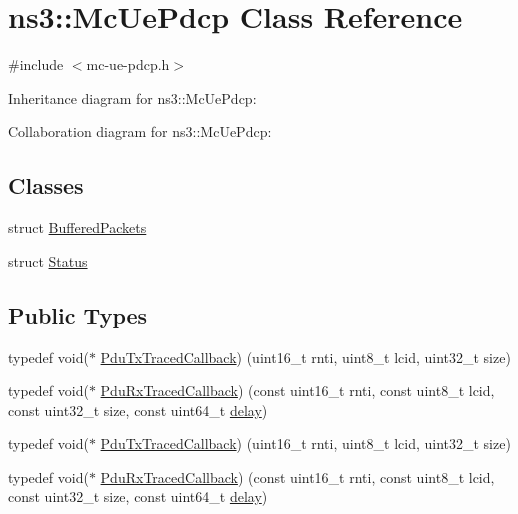 \hypertarget{classns3_1_1McUePdcp}{}\section{ns3\+:\+:Mc\+Ue\+Pdcp Class Reference}
\label{classns3_1_1McUePdcp}


{\ttfamily \#include $<$mc-\/ue-\/pdcp.\+h$>$}



Inheritance diagram for ns3\+:\+:Mc\+Ue\+Pdcp\+:


Collaboration diagram for ns3\+:\+:Mc\+Ue\+Pdcp\+:
\subsection*{Classes}
\begin{DoxyCompactItemize}
\item 
struct \hyperlink{structns3_1_1McUePdcp_1_1BufferedPackets}{Buffered\+Packets}
\item 
struct \hyperlink{structns3_1_1McUePdcp_1_1Status}{Status}
\end{DoxyCompactItemize}
\subsection*{Public Types}
\begin{DoxyCompactItemize}
\item 
typedef void($\ast$ \hyperlink{classns3_1_1McUePdcp_af312eee3e1ec8a049a82210699f47289}{Pdu\+Tx\+Traced\+Callback}) (uint16\+\_\+t rnti, uint8\+\_\+t lcid, uint32\+\_\+t size)
\item 
typedef void($\ast$ \hyperlink{classns3_1_1McUePdcp_af8bd88140b3e71f03ae54e4381183794}{Pdu\+Rx\+Traced\+Callback}) (const uint16\+\_\+t rnti, const uint8\+\_\+t lcid, const uint32\+\_\+t size, const uint64\+\_\+t \hyperlink{mmwave_2model_2fading-traces_2fading__trace__generator_8m_a7964e6aa8f61a9d28973c8267a606ad8}{delay})
\item 
typedef void($\ast$ \hyperlink{classns3_1_1McUePdcp_af312eee3e1ec8a049a82210699f47289}{Pdu\+Tx\+Traced\+Callback}) (uint16\+\_\+t rnti, uint8\+\_\+t lcid, uint32\+\_\+t size)
\item 
typedef void($\ast$ \hyperlink{classns3_1_1McUePdcp_af8bd88140b3e71f03ae54e4381183794}{Pdu\+Rx\+Traced\+Callback}) (const uint16\+\_\+t rnti, const uint8\+\_\+t lcid, const uint32\+\_\+t size, const uint64\+\_\+t \hyperlink{mmwave_2model_2fading-traces_2fading__trace__generator_8m_a7964e6aa8f61a9d28973c8267a606ad8}{delay})
\end{DoxyCompactItemize}
